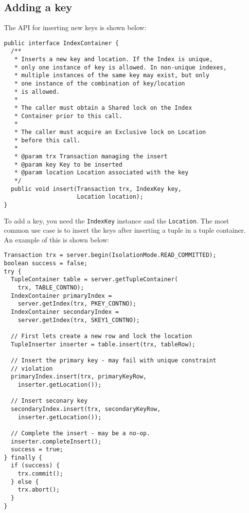 \documentclass[a4paper,draft,oneside]{book}
\begin{document}
\subsection{Adding a key}

The API for inserting new keys is shown below:

\begin{verbatim}
public interface IndexContainer {
  /**
   * Inserts a new key and location. If the Index is unique, 
   * only one instance of key is allowed. In non-unique indexes, 
   * multiple instances of the same key may exist, but only
   * one instance of the combination of key/location
   * is allowed.
   *
   * The caller must obtain a Shared lock on the Index 
   * Container prior to this call.
   * 
   * The caller must acquire an Exclusive lock on Location 
   * before this call.
   * 
   * @param trx Transaction managing the insert
   * @param key Key to be inserted
   * @param location Location associated with the key
   */
  public void insert(Transaction trx, IndexKey key, 
                     Location location);
}
\end{verbatim}

To add a key, you need the \verb|IndexKey| instance and the
\verb|Location|. The most common use case is to insert the keys
after inserting a tuple in a tuple container. An example of this is
shown below:

\begin{verbatim}
Transaction trx = server.begin(IsolationMode.READ_COMMITTED);
boolean success = false;
try {
  TupleContainer table = server.getTupleContainer(
    trx, TABLE_CONTNO);
  IndexContainer primaryIndex = 
    server.getIndex(trx, PKEY_CONTNO);
  IndexContainer secondaryIndex = 
    server.getIndex(trx, SKEY1_CONTNO);

  // First lets create a new row and lock the location
  TupleInserter inserter = table.insert(trx, tableRow);

  // Insert the primary key - may fail with unique constraint
  // violation
  primaryIndex.insert(trx, primaryKeyRow, 
    inserter.getLocation());
  
  // Insert seconary key
  secondaryIndex.insert(trx, secondaryKeyRow, 
    inserter.getLocation());

  // Complete the insert - may be a no-op.
  inserter.completeInsert();
  success = true;
} finally {
  if (success) {
    trx.commit();
  } else {
    trx.abort();
  }
}
\end{verbatim}
\end{document}
